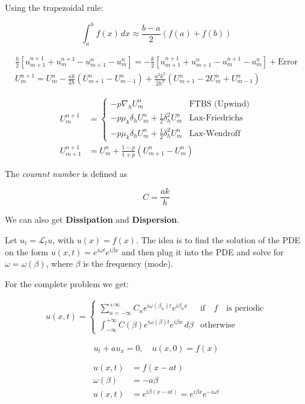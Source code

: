 Using the trapezoidal rule:

\[
  \int_a^b f(x) \, dx \approx \frac{b-a}{2}\left( f(a) + f(b) \right)
\]

\begin{align*}
  \frac{h}{2}\left[u_{m+1}^{n+1}+u_m^{n+1}-u_{m+1}^n-u_m^n\right] =  -\frac{k}{2}\left[u_{m+1}^{n+1}+u_{m+1}^n-u_m^{n+1}-u_m^n\right] + \text{Error} \\
  U_m^{n+1} = U_m^n - \frac{a k}{2h}\left( U_{m+1}^n - U_{m-1}^n \right) + \frac{a^2 k^2}{2h^2}\left( U_{m+1}^n - 2U_m^n + U_{m-1}^n \right)
\end{align*}


\begin{align*}
  U_m^{n+1}     & =
  \begin{cases}
    -p \nabla_h U_m^n                                    & \text{FTBS (Upwind)}  \\
    -p\mu_k \delta_h U_m^n + \frac{1}{2}\delta_h^2 U_m^n & \text{Lax-Friedrichs} \\
    -p\mu_k \delta_h U_m^n + \frac{1}{2}\delta_h^2 U_m^n & \text{Lax-Wendroff}
  \end{cases} \\
  U_{m+1}^{n+1} & = U_m^n + \frac{1-p}{1+p}\left(U_{m+1}^n - U_m^{n}\right)
\end{align*}


The \textit{courant number} is defined as

\[
  C = \frac{a k}{h}
\]

We can also get \textbf{Dissipation} and \textbf{Dispersion}.

Let \(u_t = \mathcal{L}_t u\), with \(u(x) = f(x)\).
The idea is to find the solution of the PDE on the form \(u(x,t) = e^{i\omega t}e^{i\beta x}\) and then plug it into the PDE and solve for \(\omega= \omega(\beta)\), where \(\beta\) is the frequency (mode).

For the complete problem we get:

\begin{align*}
  u(x,t) =
  \begin{cases}
    \sum_{n=-\infty}^{+\infty} C_n e^{i\omega(\beta_n)t}e^{i\beta_n x}          & \text{if} \quad f \quad \text{is periodic} \\
    \int_{-\infty}^{+\infty} C(\beta) e^{i\omega(\beta)t}e^{i\beta x} \, d\beta & \text{otherwise}
  \end{cases}
\end{align*}

\begin{example}{}{}
  \[
    u_t + a u_x = 0, \quad u(x,0) = f(x)
  \]

  \begin{align*}
    u(x,t)        & = f(x-at)                                         \\
    \omega(\beta) & = -a\beta                                         \\
    u(x,t)        & = e^{i\beta(x - at)} = e^{i\beta x}e^{-i\omega t}
  \end{align*}

\end{example}

